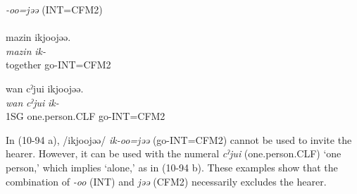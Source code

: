 \ea\label{ex:10.94}   \textit{{}-oo=jəə} (INT=CFM2)\\
  \ea{}\\
      \glll    *mazin  ikjoojəə.\\
       \textit{mazin}  \textit{ik-}\\
       together  go-INT=CFM2\\
       \glt\relax      [El: 090830]

  \ex  %
      \glll    wan  cˀjui  ikjoojəə.\\
       \textit{wan}  \textit{cˀjui}  \textit{ik-}\\
       1SG  one.person.CLF  go-INT=CFM2\\
       \glt\relax    [El: 090830]
    \z
\z

In (10-94 a), /ikjoojəə/ \textit{ik-oo=jəə} (go-INT=CFM2) cannot be used to invite the hearer. However, it can be used with the numeral \textit{cˀjui} (one.person.CLF) ‘one person,’ which implies ‘alone,’ as in (10-94 b). These examples show that the combination of \textit{{}-oo} (INT) and \textit{jəə} (CFM2) necessarily excludes the hearer.
